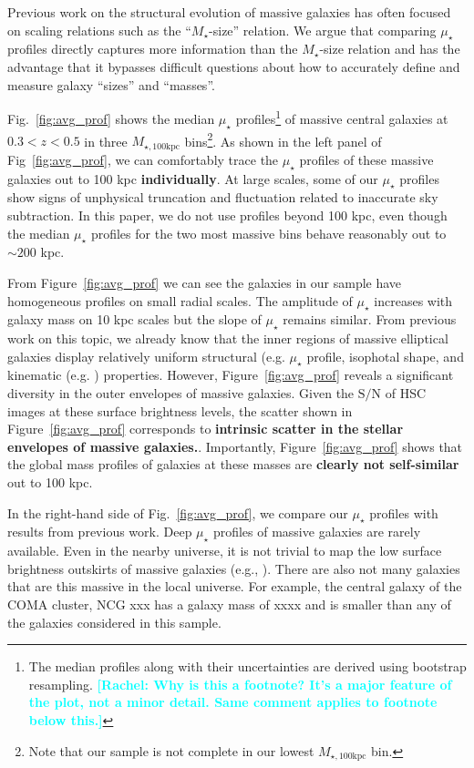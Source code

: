 \documentclass[a4paper,fleqn,usenatbib]{mnras}
\def\mstar{{$M_{\star}$}}
\def\mtot{{$M_{\star,100\mathrm{kpc}}$}}
\def\s2n{{$\mathrm{S}/\mathrm{N}$}}
\def\mden{{$\mu_{\star}$}}
\newcommand{\rachel}[1]{\textcolor{cyan}{\textbf{[Rachel: #1]}}}
\begin{document}
    Previous work on the structural evolution of massive galaxies has often focused on scaling relations such as the ``\mstar{}-size'' relation.  We argue that  comparing \mden{} 
    profiles  directly  captures more information than the \mstar{}-size relation and  has the advantage that it bypasses difficult questions 
    about how to accurately define and measure galaxy ``sizes'' and ``masses''.
    
    Fig.~\ref{fig:avg_prof} shows the median \mden{} profiles\footnote{The median 
    profiles along with their uncertainties are derived using bootstrap resampling. \rachel{Why is this a footnote?  It's a major feature of the plot, not a minor detail.  Same comment applies to footnote below this.}} of massive central galaxies at $0.3 < z < 0.5$ in three \mtot{} 
    bins\footnote{Note that our sample is not complete in our lowest \mtot{} bin.}. 
    As shown in the left panel of Fig~\ref{fig:avg_prof}, we can comfortably trace
    the \mden{} profiles of these massive galaxies out to 100 kpc 
    \textbf{individually}.  At large scales, some of our \mden{} profiles show signs of unphysical truncation and fluctuation 
    related to inaccurate sky subtraction. In this paper, we do not use profiles beyond 100 kpc, even though the median 
    \mden{} profiles for the two most massive bins behave reasonably out to 
    ${\sim} 200$ kpc. 
       
       From Figure~\ref{fig:avg_prof} we can see  the galaxies in our sample have homogeneous profiles on small radial scales. The amplitude of \mden{} increases with galaxy mass on 10 kpc scales but the slope of  \mden{} remains similar.  From previous work on this topic, we already know that the inner regions of massive elliptical galaxies display relatively uniform structural (e.g. \mden{} profile, isophotal shape, 
    \citealt{Lauer07, Kormendy2009, Schombert2015} and kinematic (e.g. 
    \citealt{Cappellari13b}) properties.  However,  Figure~\ref{fig:avg_prof} reveals  a significant diversity in the outer envelopes of massive galaxies.  Given the \s2n{} of HSC images at these surface brightness levels, the scatter shown in Figure~\ref{fig:avg_prof} corresponds to \textbf{intrinsic scatter in the stellar envelopes of massive galaxies.}. Importantly, Figure~\ref{fig:avg_prof} shows that the global mass profiles of galaxies at these masses are  \textbf{clearly not 
    self-similar} out to 100 kpc. 
    
    
In the right-hand side of Fig.~\ref{fig:avg_prof}, we compare our 
\mden{} profiles with results from previous  work. Deep \mden{} profiles of massive galaxies are rarely available. Even in the nearby universe, it is not trivial to map the low surface brightness  outskirts of massive galaxies (e.g., 
    \citealt{Capaccioli2015, Iodice2016, Iodice2017, Spavone2017, Mihos2017}). There are also not many galaxies that are this massive in the local universe. For example, the central galaxy of the COMA cluster, NCG xxx has a galaxy mass of xxxx and is smaller than any of the galaxies considered in this sample.
       
\end{document}
